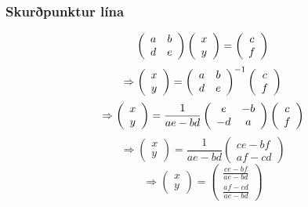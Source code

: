 {
	\frametitle{Skurðpunktur lína}
		\[
			\left (
			\begin{array}{c c}
				a & b\\
				d & e
			\end{array}
			\right )
			\left (
			\begin{array}{c}
				x\\
				y
			\end{array}
			\right )
			=
			\left (
			\begin{array}{c}
				c\\
				f
			\end{array}
			\right )
		\]
			\pause 
		\[
			\Rightarrow
			\left (
			\begin{array}{c}
				x\\
				y
			\end{array}
			\right )
			=
			\left (
			\begin{array}{c c}
				a & b\\
				d & e
			\end{array}
			\right )^{-1}
			\left (
			\begin{array}{c}
				c\\
				f
			\end{array}
			\right )
		\]
			\pause 
		\[
			\Rightarrow
			\left (
			\begin{array}{c}
				x\\
				y
			\end{array}
			\right )
			=
			\frac{1}{ae - bd}
			\left (
			\begin{array}{c c}
				e & -b\\
				-d & a
			\end{array}
			\right )
			\left (
			\begin{array}{c}
				c\\
				f
			\end{array}
			\right )
		\]
			\pause 
		\[
			\Rightarrow
			\left (
			\begin{array}{c}
				x\\
				y
			\end{array}
			\right )
			=
			\frac{1}{ae - bd}
			\left (
			\begin{array}{c}
				ce - bf\\
				af - cd
			\end{array}
			\right )
		\]
			\pause 
		\[
			\Rightarrow
			\left (
			\begin{array}{c}
				x\\
				y
			\end{array}
			\right )
			=
			\left (
			\begin{array}{c}
			\frac{ce - bf}{ae - bd}\\
			\frac{af - cd}{ae - bd}
			\end{array}
			\right )
		\]
}

